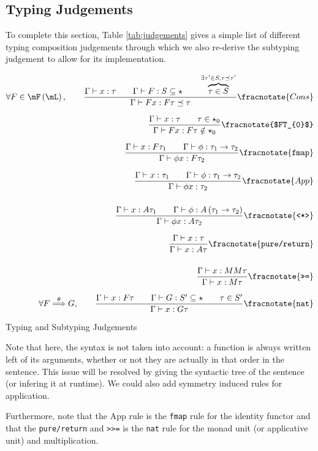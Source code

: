 \documentclass[math, english, info]{cours}
\def\cont{\Gamma\vdash}
\def\poulpe{\qquad}
\begin{document}
\subsection{Typing Judgements}\label{subsec:judgements}
To complete this section, Table \ref{tab:judgements} gives a simple list of different typing composition judgements through which we also re-derive the subtyping judgement to allow for its implementation.
\begin{table}
\begin{align*}
	\forall F \in \mF\left( \mL \right),\poulpe
	\frac{\cont x: \tau \poulpe \cont F: S\subseteq \star \poulpe \overbrace{\tau \in S}^{\exists \tau'\in S, \tau \preceq \tau'}}{\cont Fx: F\tau \preceq \tau}\fracnotate{Cons}\\[.25cm]
	\frac{\cont x: \tau \poulpe \tau \in \star_{0}}{\cont Fx: F\tau \notin \star_{0}}\fracnotate{$FT_{0}$}\\[.25cm]
	\frac{\cont x: F\tau_{1} \poulpe \cont \phi: \tau_{1} \to \tau_{2}}{\cont \phi x: F\tau_{2} }\fracnotate{\texttt{fmap}}\\[.25cm]
	\frac{\cont x: \tau_{1} \poulpe \cont \phi: \tau_{1} \to \tau_{2}}{\cont \phi x: \tau_{2}}\fracnotate{App}\\[.5cm]
	\frac{\cont x: A\tau_{1} \poulpe \cont \phi: A\left( \tau_{1} \to \tau_{2} \right)}{\cont \phi x: A\tau_{2}}\fracnotate{\texttt{<*>}}\\[.25cm]
	\frac{\cont x: \tau}{\cont x: A\tau}\fracnotate{\texttt{pure/return}}\\[.5cm]
	\frac{\cont x: MM\tau}{\cont x: M\tau}\fracnotate{\texttt{>>=}}\\[.25cm]
	\forall F \overset{\theta}{\Longrightarrow} G,\poulpe \frac{\cont x: F\tau \poulpe \cont G: S' \subseteq \star \poulpe \tau \in S'}{\cont x : G\tau}\fracnotate{\texttt{nat}}
\end{align*}
\caption{Typing and Subtyping Judgements}
\label{tab:judgements}
\end{table}
Note that here, the syntax is not taken into account: a function is always written left of its arguments, whether or not they are actually in that order in the sentence.
This issue will be resolved by giving the syntactic tree of the sentence (or infering it at runtime).
We could also add symmetry induced rules for application.

Furthermore, note that the App rule is the \texttt{fmap} rule for the identity functor and that the \texttt{pure/return} and \texttt{>>=} is the \texttt{nat} rule for the monad unit (or applicative unit) and multiplication.
\end{document}
